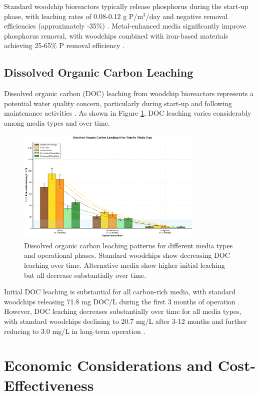 \documentclass[12pt,a4paper]{article}
\begin{document}
Standard woodchip bioreactors typically release phosphorus during the start-up phase, with leaching rates of 0.08-0.12 g P/m$^3$/day and negative removal efficiencies (approximately -35\%) \citep{RN291}. Metal-enhanced media significantly improve phosphorus removal, with woodchips combined with iron-based materials achieving 25-65\% P removal efficiency \citep{RN282}.

\subsection{Dissolved Organic Carbon Leaching}

Dissolved organic carbon (DOC) leaching from woodchip bioreactors represents a potential water quality concern, particularly during start-up and following maintenance activities \citep{RN291, RN242}. As shown in Figure \ref{fig:doc_leaching}, DOC leaching varies considerably among media types and over time.

\begin{figure}[ht]
\centering
\includegraphics[width=0.8\textwidth]{fig8_doc_leaching_scientific}
\caption{Dissolved organic carbon leaching patterns for different media types and operational phases. Standard woodchips show decreasing DOC leaching over time. Alternative media show higher initial leaching but all decrease substantially over time.}
\label{fig:doc_leaching}
\end{figure}

Initial DOC leaching is substantial for all carbon-rich media, with standard woodchips releasing 71.8 mg DOC/L during the first 3 months of operation \citep{RN291}. However, DOC leaching decreases substantially over time for all media types, with standard woodchips declining to 20.7 mg/L after 3-12 months and further reducing to 3.0 mg/L in long-term operation \citep{RN291}.

\section{Economic Considerations and Cost-Effectiveness}
\end{document}

